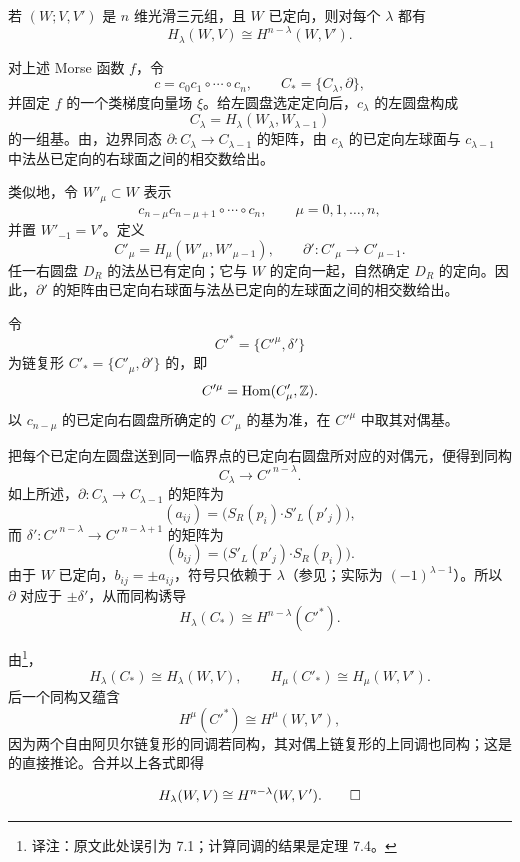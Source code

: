 若 $(W;V,V')$ 是 $n$ 维光滑三元组，且 $W$ 已定向，则对每个 $\lambda$ 都有
\[
  H_\lambda(W,V)\cong H^{n-\lambda}(W,V').
\]

\Proof 对上述 Morse 函数 $f$，令
\[
  c=c_0c_1\circ\cdots\circ c_n,
  \qquad C_*=\{C_\lambda,\partial\},
\]
并固定 $f$ 的一个类梯度向量场 $\xi$。给左圆盘选定定向后，$c_\lambda$ 的左圆盘构成
\[
  C_\lambda=H_\lambda(W_\lambda,W_{\lambda-1})
\]
的一组基。由，边界同态 $\partial:C_\lambda\to C_{\lambda-1}$ 的矩阵，由 $c_\lambda$ 的已定向左球面与 $c_{\lambda-1}$ 中法丛已定向的右球面之间的相交数给出。

类似地，令 $W'_\mu\subset W$ 表示
\[
  c_{n-\mu}c_{n-\mu+1}\circ\cdots\circ c_n,
  \qquad \mu=0,1,\ldots,n,
\]
并置 $W'_{-1}=V'$。定义
\[
  C'_\mu=H_\mu(W'_\mu,W'_{\mu-1}),
  \qquad
  \partial':C'_\mu\longrightarrow C'_{\mu-1}.
\]
任一右圆盘 $D_R$ 的法丛已有定向；它与 $W$ 的定向一起，自然确定 $D_R$ 的定向。因此，$\partial'$ 的矩阵由已定向右球面与法丛已定向的左球面之间的相交数给出。

令
\[
  C'^*=\{C'^\mu,\delta'\}
\]
为链复形 $C'_* =\{C'_\mu,\partial'\}$ 的，即
\[
  C'^\mu=\operatorname{Hom}(C'_\mu,\mathbb{Z}).
\]
以 $c_{n-\mu}$ 的已定向右圆盘所确定的 $C'_\mu$ 的基为准，在 $C'^\mu$ 中取其对偶基。

把每个已定向左圆盘送到同一临界点的已定向右圆盘所对应的对偶元，便得到同构
\[
  C_\lambda\longrightarrow C'^{\,n-\lambda}.
\]
如上所述，$\partial:C_\lambda\to C_{\lambda-1}$ 的矩阵为
\[
  (a_{ij})=
  \bigl(S_R(p_i)\mathbin{\boldsymbol\cdot}S'_L(p'_j)\bigr),
\]
而 $\delta':C'^{\,n-\lambda}\to C'^{\,n-\lambda+1}$ 的矩阵为
\[
  (b_{ij})=
  \bigl(S'_L(p'_j)\mathbin{\boldsymbol\cdot}S_R(p_i)\bigr).
\]
由于 $W$ 已定向，$b_{ij}=\pm a_{ij}$，符号只依赖于 $\lambda$（参见；实际为 $(-1)^{\lambda-1}$）。所以 $\partial$ 对应于 $\pm\delta'$，从而同构诱导
\[
  H_\lambda(C_*)\cong H^{n-\lambda}(C'^*).
\]

由\footnote{译注：原文此处误引为 7.1；计算同调的结果是定理 7.4。}，
\[
  H_\lambda(C_*)\cong H_\lambda(W,V),
  \qquad
  H_\mu(C'_*)\cong H_\mu(W,V').
\]
后一个同构又蕴含
\[
  H^\mu(C'^*)\cong H^\mu(W,V'),
\]
因为两个自由阿贝尔链复形的同调若同构，其对偶上链复形的上同调也同构；这是的直接推论。合并以上各式即得
\begin{MilnorProofEnd}
\[
  H_\lambda(W,V)\cong H^{n-\lambda}(W,V').\qedhere
\]
\end{MilnorProofEnd}

